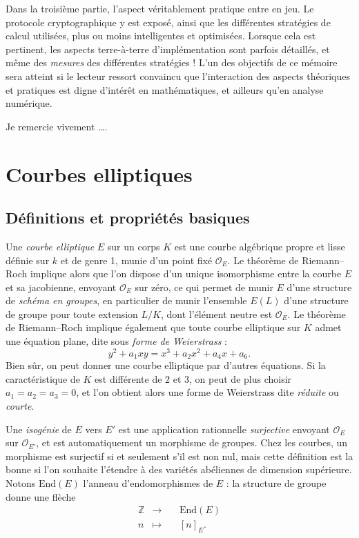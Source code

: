 \documentclass[11pt,a4paper]{article}
\newcommand{\Z}{\mathbb{Z}}
\renewcommand{\O}{\mathcal{O}}
\newcommand{\End}{\mathrm{End}}
\theoremstyle{definition}
\begin{document}
Dans la troisième partie, l'aspect véritablement pratique entre en jeu. Le protocole cryptographique y est exposé, ainsi que les différentes stratégies de calcul utilisées, plus ou moins intelligentes et optimisées. Lorsque cela est pertinent, les aspects terre-à-terre d'implémentation sont parfois détaillés, et même des \emph{mesures} des différentes stratégies !  L'un des objectifs de ce mémoire sera atteint si le lecteur ressort convaincu que l'interaction des aspects théoriques et pratiques est digne d'intérêt en mathématiques, et ailleurs qu'en analyse numérique.

Je remercie vivement \ldots.

\newpage

\tableofcontents

\newpage

\section{Courbes elliptiques}

\subsection{Définitions et propriétés basiques}

Une \emph{courbe elliptique} $E$ sur un corps $K$ est une courbe algébrique propre et lisse définie sur $k$ et de genre 1, munie d'un point fixé $\O_E$. Le théorème de Riemann--Roch implique alors que l'on dispose d'un unique isomorphisme entre la courbe $E$ et sa jacobienne, envoyant $\O_E$ sur zéro, ce qui permet de munir $E$ d'une structure de \emph{schéma en groupes}, en particulier de munir l'ensemble $E(L)$ d'une structure de groupe pour toute extension $L/K$, dont l'élément neutre est $\O_E$. Le théorème de Riemann--Roch implique également que toute courbe elliptique sur $K$ admet une équation plane, dite sous \emph{forme de Weierstrass} :
$$y^2 + a_1xy = x^3 + a_2x^2 + a_4 x + a_6.$$
Bien sûr, on peut donner une courbe elliptique par d'autres équations. Si la caractéristique de $K$ est différente de 2 et 3, on peut de plus choisir $a_1 = a_2 = a_3 = 0$, et l'on obtient alors une forme de Weierstrass dite \emph{réduite} ou \emph{courte}.

Une \emph{isogénie} de $E$ vers $E'$ est une application rationnelle \emph{surjective} envoyant $\O_E$ sur $\O_{E'}$, et est automatiquement un morphisme de groupes. Chez les courbes, un morphisme est surjectif si et seulement s'il est non nul, mais cette définition est la bonne si l'on souhaite l'étendre à des variétés abéliennes de dimension supérieure. Notons $\End(E)$ l'anneau d'endomorphismes de $E$ : la structure de groupe donne une flèche
$$\begin{aligned}
&\Z &\longrightarrow&\ &\End(E) &\\
&n &\longmapsto& &[n]_E .\ \ &
\end{aligned}$$
\end{document}

